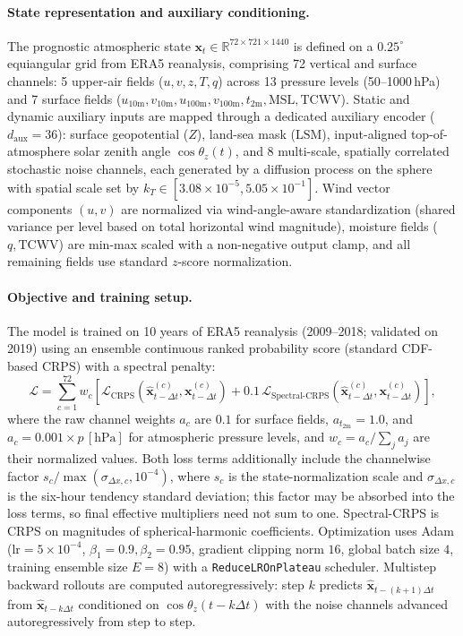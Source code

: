 \documentclass{article}
\begin{document}
\paragraph{State representation and auxiliary conditioning.}
The prognostic atmospheric state $\mathbf{x}_t \in \mathbb{R}^{72 \times 721 \times 1440}$ is defined on a $0.25^\circ$ equiangular grid from ERA5 reanalysis, comprising 72 vertical and surface channels: 5 upper-air fields ($u, v, z, T, q$) across 13 pressure levels (50--1000\,hPa) and 7 surface fields ($u_{10\text{m}}, v_{10\text{m}}, u_{100\text{m}}, v_{100\text{m}}, t_{2\text{m}}, \text{MSL}, \text{TCWV}$). Static and dynamic auxiliary inputs are mapped through a dedicated auxiliary encoder ($d_{\text{aux}}=36$): surface geopotential ($Z$), land-sea mask ($\text{LSM}$), input-aligned top-of-atmosphere solar zenith angle $\cos\theta_z(t)$, and 8 multi-scale, spatially correlated stochastic noise channels, each generated by a diffusion process on the sphere with spatial scale set by $k_T \in [3.08\times 10^{-5}, 5.05\times 10^{-1}]$. Wind vector components $(u, v)$ are normalized via wind-angle-aware standardization (shared variance per level based on total horizontal wind magnitude), moisture fields ($q, \text{TCWV}$) are min-max scaled with a non-negative output clamp, and all remaining fields use standard $z$-score normalization.

\paragraph{Objective and training setup.}
The model is trained on 10 years of ERA5 reanalysis (2009--2018; validated on 2019) using an ensemble continuous ranked probability score (standard CDF-based CRPS) with a spectral penalty:
\begin{equation}
\mathcal{L} = \sum_{c=1}^{72} w_c \left[ \mathcal{L}_{\text{CRPS}}\!\left(\hat{\mathbf{x}}_{t-\Delta t}^{(c)}, \mathbf{x}_{t-\Delta t}^{(c)}\right) + 0.1\,
\mathcal{L}_{\text{Spectral-CRPS}}\!\left(\hat{\mathbf{x}}_{t-\Delta t}^{(c)}, \mathbf{x}_{t-\Delta t}^{(c)}\right) \right],
\end{equation}
where the raw channel weights $a_c$ are $0.1$ for surface fields, $a_{t_{2\text{m}}} = 1.0$, and $a_c = 0.001 \times p\,[\text{hPa}]$ for atmospheric pressure levels, and $w_c = a_c / \sum_j a_j$ are their normalized values. Both loss terms additionally include the channelwise factor $s_c / \max(\sigma_{\Delta x,c}, 10^{-4})$, where $s_c$ is the state-normalization scale and $\sigma_{\Delta x,c}$ is the six-hour tendency standard deviation; this factor may be absorbed into the loss terms, so final effective multipliers need not sum to one. Spectral-CRPS is CRPS on magnitudes of spherical-harmonic coefficients. Optimization uses Adam ($\text{lr} = 5\times 10^{-4}$, $\beta_1 = 0.9, \beta_2 = 0.95$, gradient clipping norm $16$,
global batch size $4$, training ensemble size $E=8$) with a \texttt{ReduceLROnPlateau} scheduler. Multistep backward rollouts are computed autoregressively: step $k$ predicts $\hat{\mathbf{x}}_{t-(k+1)\Delta t}$ from $\hat{\mathbf{x}}_{t-k\Delta t}$ conditioned on $\cos\theta_z(t-k\Delta t)$ with the noise channels advanced autoregressively from step to step.
\end{document}

